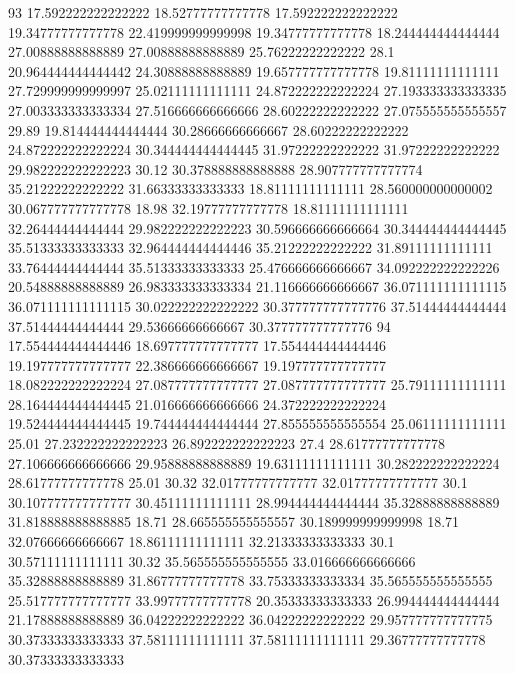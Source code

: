 93 17.592222222222222 18.52777777777778 17.592222222222222 19.34777777777778 22.419999999999998 19.34777777777778 18.244444444444444 27.00888888888889 27.00888888888889 25.76222222222222 28.1 20.964444444444442 24.30888888888889 19.657777777777778 19.81111111111111 27.729999999999997 25.02111111111111 24.872222222222224 27.193333333333335 27.003333333333334 27.516666666666666 28.60222222222222 27.075555555555557 29.89 19.814444444444444 30.28666666666667 28.60222222222222 24.872222222222224 30.344444444444445 31.97222222222222 31.97222222222222 29.982222222222223 30.12 30.378888888888888 28.907777777777774 35.21222222222222 31.66333333333333 18.81111111111111 28.560000000000002 30.067777777777778 18.98 32.19777777777778 18.81111111111111 32.26444444444444 29.982222222222223 30.596666666666664 30.344444444444445 35.51333333333333 32.964444444444446 35.21222222222222 31.89111111111111 33.76444444444444 35.51333333333333 25.476666666666667 34.092222222222226 20.54888888888889 26.983333333333334 21.116666666666667 36.071111111111115 36.071111111111115 30.022222222222222 30.377777777777776 37.51444444444444 37.51444444444444 29.53666666666667 30.377777777777776
94 17.554444444444446 18.697777777777777 17.554444444444446 19.197777777777777 22.386666666666667 19.197777777777777 18.082222222222224 27.087777777777777 27.087777777777777 25.79111111111111 28.164444444444445 21.016666666666666 24.372222222222224 19.524444444444445 19.744444444444444 27.855555555555554 25.06111111111111 25.01 27.232222222222223 26.892222222222223 27.4 28.61777777777778 27.106666666666666 29.95888888888889 19.63111111111111 30.282222222222224 28.61777777777778 25.01 30.32 32.01777777777777 32.01777777777777 30.1 30.107777777777777 30.45111111111111 28.994444444444444 35.32888888888889 31.818888888888885 18.71 28.665555555555557 30.189999999999998 18.71 32.07666666666667 18.86111111111111 32.21333333333333 30.1 30.57111111111111 30.32 35.565555555555555 33.016666666666666 35.32888888888889 31.86777777777778 33.75333333333334 35.565555555555555 25.517777777777777 33.99777777777778 20.35333333333333 26.994444444444444 21.17888888888889 36.04222222222222 36.04222222222222 29.957777777777775 30.37333333333333 37.58111111111111 37.58111111111111 29.36777777777778 30.37333333333333
